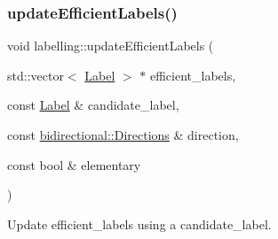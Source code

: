 \subsubsection{\texorpdfstring{update\+Efficient\+Labels()}{updateEfficientLabels()}}
{\footnotesize\ttfamily void labelling\+::update\+Efficient\+Labels (\begin{DoxyParamCaption}\item[{std\+::vector$<$ \hyperlink{classlabelling_1_1Label}{Label} $>$ $\ast$}]{efficient\+\_\+labels,  }\item[{const \hyperlink{classlabelling_1_1Label}{Label} \&}]{candidate\+\_\+label,  }\item[{const \hyperlink{namespacebidirectional_a4cbe6f0bfbd3629c2cd44c98014aed70}{bidirectional\+::\+Directions} \&}]{direction,  }\item[{const bool \&}]{elementary }\end{DoxyParamCaption})}



Update efficient\+\_\+labels using a candidate\+\_\+label. 

